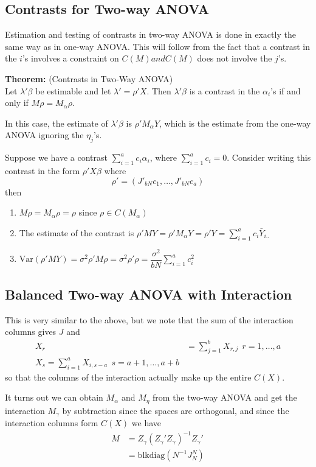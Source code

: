 \documentclass[12pt]{article}
\newcommand{\Var}{\mathrm{Var}}
\newcommand{\blkdiag}{\text{blkdiag}}
\numberwithin{equation}{section}
\begin{document}
\subsection{Contrasts for Two-way ANOVA}
Estimation and testing of contrasts in two-way ANOVA is done in
exactly the same way as in one-way ANOVA. This will follow from
the fact that a contrast in the $i$'s involves a constraint on $C(M) and C(M)$ does not involve the $j$'s.

\textbf{Theorem:} (Contrasts in Two-Way ANOVA) \\
Let $\lambda'\beta$ be estimable and let $\lambda' = \rho'X$. Then $\lambda'\beta$ is a contrast in the $\alpha_i$'s if and only if $M\rho = M_{\alpha}\rho$.

In this case, the estimate of $\lambda' \beta$ is $\rho'M_\alpha Y$, which is the estimate from the one-way ANOVA ignoring the $\eta_j$'s. 

Suppose we have a contrast $\sum_{i = 1}^a c_i \alpha_i$, where $\sum_{i = 1}^a c_i = 0$. Consider writing this contrast in the form $\rho'X\beta$ where
\begin{equation*}
  \rho' = (J'_{bN} c_1, \ldots, J'_{bN}c_a)
\end{equation*}
then
\begin{enumerate}
  \item $M\rho = M_\alpha \rho = \rho$ since $\rho \in C(M_\alpha)$
  \item The estimate of the contrast is $\rho'MY = \rho'M_\alpha Y = \rho'Y = \sum_{i=1}^a c_i \bar{Y}_{i..}$
  \item $\Var(\rho'MY) = \sigma^2 \rho'M\rho = \sigma^2 \rho'\rho = \dfrac{\sigma^2}{bN} \sum_{i=1}^a c_i^2$
\end{enumerate}

\subsection{Balanced Two-way ANOVA with Interaction}
This is very similar to the above, but we note that the sum of the interaction columns gives $J$ and
\begin{align*}
  X_r &= \sum_{j = 1}^b X_{r, j}\ \ r = 1, \ldots, a \\
  X_s = \sum_{i = 1}^a X_{i, s-a} \ \ s = a+1, \ldots, a+b
\end{align*}
so that the columns of the interaction actually make up the entire $C(X)$.

It turns out we can obtain $M_\alpha$ and $M_\eta$ from the two-way ANOVA and get the interaction $M_\gamma$ by subtraction since the spaces are orthogonal, and since the interaction columns form $C(X)$ we have
\begin{align*}
  M &= Z_\gamma (Z_\gamma' Z_\gamma)^{-1} Z_\gamma ' \\
    &= \blkdiag(N^{-1} J_{N}^N)
\end{align*}
\end{document}
